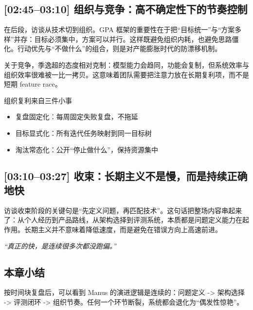 \subsection{[02:45--03:10] 组织与竞争：高不确定性下的节奏控制}

在后段，访谈从技术切到组织。GPA 框架的重要性在于把“目标统一”与“方案多样”并存：目标必须集中，方案可以并行。这样既避免组织内耗，也避免思路僵化。行动优先与“不做什么”的组合，则是对产能膨胀时代的防漂移机制。

关于竞争，季逸超的态度相对克制：模型能力会趋同，功能会复制，但系统效率与组织效率很难被一比一拷贝。这意味着团队需要把注意力放在长期复利项，而不是短期 feature race。

\begin{knowledgebox}{组织复利来自三件小事}
\begin{itemize}
    \item 复盘固定化：每周固定失败复盘，不拖延
    \item 目标显式化：所有迭代任务映射到同一目标树
    \item 淘汰常态化：公开“停止做什么”，保持资源集中
\end{itemize}
\end{knowledgebox}

\subsection{[03:10--03:27] 收束：长期主义不是慢，而是持续正确地快}

访谈收束阶段的关键句是“先定义问题，再匹配技术”。这句话把整场内容串起来了：从个人经历到产品路线，从架构选择到评测系统，本质都是问题定义能力在起作用。长期主义并不意味着降低速度，而是避免在错误方向上高速前进。

\textit{``真正的快，是连续很多次都没跑偏。''}

\subsection{本章小结}

按时间块复盘后，可以看到 Manus 的演进逻辑是连续的：问题定义 -> 架构选择 -> 评测闭环 -> 组织节奏。任何一个环节断裂，系统都会退化为“偶发性惊艳”。


